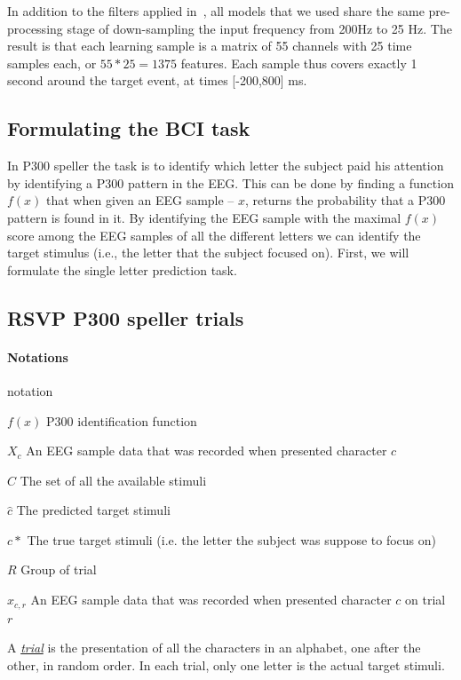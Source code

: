 \documentclass[
12pt, %
english, %
doublespacing, %
headsepline, %
]{MastersDoctoralThesis} %
\begin{document}
In addition to the filters applied in~\cite{BlaknertzExperiment}, all models that we used share the same pre-processing stage of down-sampling the input frequency from 200Hz to 25 Hz. The result is that each learning sample is a matrix of 55 channels with 25 time samples each, or $55*25 = 1375$ features. Each sample thus covers exactly 1 second around the target event, at times [-200,800] ms.

\subsection{Formulating the BCI task}
In P300 speller the task is to identify which letter the subject paid his attention by identifying a P300 pattern in the EEG. This can be done by finding a function $f(x)$ that when given an EEG sample – $x$, returns the probability that a P300 pattern is found in it. By identifying the EEG sample with the maximal $f(x)$ score among the EEG samples of all the different letters we can identify the target stimulus (i.e., the letter that the subject focused on). First, we will formulate the single letter prediction task.

\subsection{RSVP P300 speller trials}

\paragraph{Notations}
\begin{labeling}{notation}
	\item [$f(x)$] P300 identification function
	\item [$X_c$] An EEG sample data that was recorded when presented character $c$
	\item [$C$] The set of all the available stimuli 
	\item [$\hat{c}$] The predicted target stimuli
	\item [$c*$] The true target stimuli (i.e. the letter the subject was suppose to focus on)	
	\item [$R$] Group of trial
	\item [$x_{c,r}$] An EEG sample data that was recorded when presented character $c$ on trial $r$
\end{labeling}

A \underline{\textit{trial}} is the presentation of all the characters in an alphabet, one after the other, in random order. In each trial, only one letter is the actual target stimuli.  
\end{document}
